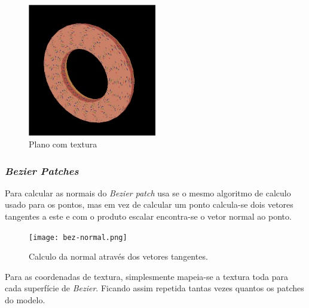\documentclass[a4paper]{article}
\begin{document}
\begin{figure}[H]
    \centering
    \includegraphics[width=0.5\textwidth]{torus.png}
    \caption{Plano com textura}
\end{figure}

\subsubsection{\textit{Bezier Patches}}

Para calcular as normais do \textit{Bezier patch} usa se o mesmo algoritmo de
calculo usado para os pontos, mas em vez de calcular um ponto calcula-se dois
vetores tangentes a este e com o produto escalar encontra-se o vetor normal ao
ponto.

\begin{figure}[H]
    \centering
    \texttt{[image: bez-normal.png]}
    \caption{Calculo da normal através dos vetores tangentes.}
\end{figure}

Para as coordenadas de textura, simplesmente mapeia-se a textura toda para cada
superfície de \textit{Bezier}. Ficando assim repetida tantas vezes quantos os
patches do modelo.
\end{document}
